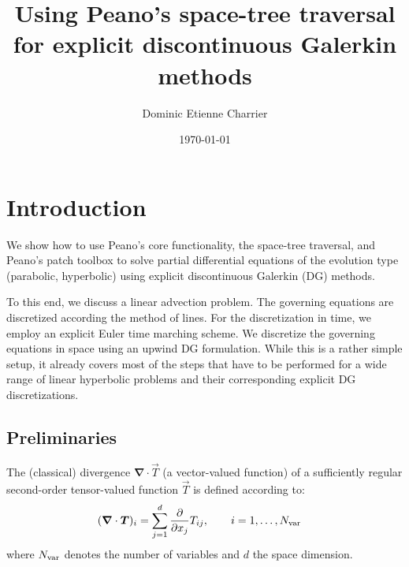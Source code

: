 \documentclass{scrreprt}
\begin{document}
\title{Using Peano's space-tree traversal for explicit
discontinuous Galerkin methods}
\author{Dominic Etienne Charrier}
\date{\today}
\maketitle
\chapter{Introduction}
We show how to use Peano's core functionality, the space-tree traversal,
and Peano's patch toolbox to solve partial differential
equations of the evolution type (parabolic, hyperbolic) using
explicit discontinuous Galerkin (DG) methods.

To this end, we discuss a linear advection problem.
The governing equations are discretized according
the method of lines. For the discretization in time, we employ an explicit
Euler time marching scheme.
We discretize the governing equations in space using an upwind DG formulation.
While this is a rather simple setup, it already covers most of the
steps that have to be performed for a wide range of linear
hyperbolic problems and their corresponding explicit DG discretizations.
\section{Preliminaries}
The (classical) divergence $\boldsymbol{\nabla}\cdot\vec{T}$ (a vector-valued
function) of a sufficiently regular second-order tensor-valued function
$\vec{T}$ is defined according to:
\begin{align}
(\boldsymbol{\nabla}\cdot\vec{T})_{i} &= \sum_{j=1}^d
\frac{\partial}{\partial x_j} T_{ij},\qquad
i=1,\ldots,N_{\textup{var}}
\end{align}
where $N_\textup{var}$ denotes the number of variables
and $d$ the space dimension.

%
\end{document}
